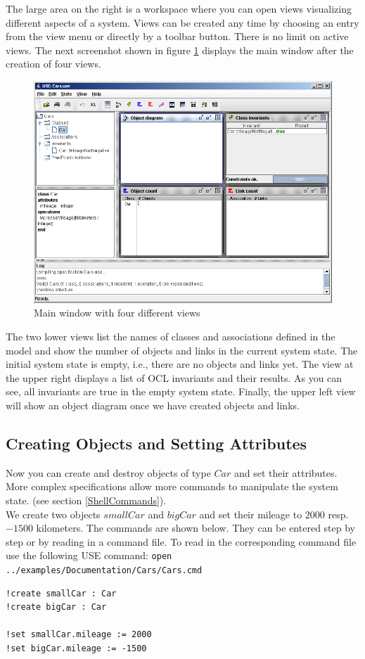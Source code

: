 \documentclass[a4paper,titlepage,oneside,final]{scrreprt} %
\begin{document}
The large area on the right is a workspace where you can open
views visualizing different aspects of a system. Views can be
created any time by choosing an entry from the view menu or directly
by a toolbar button. There is no limit on active views. The next screenshot shown in
figure \ref{fig:WorkingspaceViews}
displays the main window after the creation of four views.
\begin{figure}[ht]
\centering
\includegraphics[scale=0.5]{Screenshots/GUI/WorkingspaceViews.png}
\caption{Main window with four different views}
\label{fig:WorkingspaceViews}
\end{figure}
The two lower views list the names of classes and associations defined
in the model and show the number of objects and links in the current system state.
The initial system state is empty, i.e., there are no objects and links yet.
The view at the upper right displays a list of OCL invariants and their results.
As you can see, all invariants are true in the empty system state. Finally, the
upper left view will show an object diagram once we have created objects and links.
\subsection{Creating Objects and Setting Attributes}
Now you can create and destroy objects of type $\mathit{Car}$ and set their attributes.
More complex specifications allow more commands to manipulate the system state. (see
section \ref{ShellCommands}).\\
We create two objects $\mathit{smallCar}$ and $\mathit{bigCar}$ and set their
mileage to $2000$ resp. $-1500$ kilometers. The commands are shown below. They can
be entered step by step or by reading in a command file. To read in the corresponding
command file use the following USE command: \verb+open ../examples/Documentation/Cars/Cars.cmd+
\begin{verbatim}
!create smallCar : Car
!create bigCar : Car

!set smallCar.mileage := 2000
!set bigCar.mileage := -1500
\end{verbatim}
\end{document}
